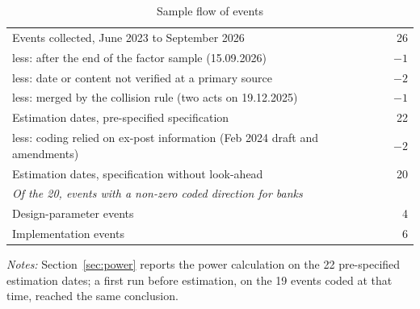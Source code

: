 \documentclass[11pt]{article}
\theoremstyle{plain}\newtheorem{proposition}{Proposition}
\begin{document}
\begin{table}[ht]\centering\small
\begin{threeparttable}
\caption{Sample flow of events}\label{tab:flow}
\begin{tabular}{lr}
\toprule
Events collected, June 2023 to September 2026 & 26 \\
\quad less: after the end of the factor sample (15.09.2026) & $-1$ \\
\quad less: date or content not verified at a primary source & $-2$ \\
\quad less: merged by the collision rule (two acts on 19.12.2025) & $-1$ \\
Estimation dates, pre-specified specification & 22 \\
\quad less: coding relied on ex-post information (Feb 2024 draft and amendments) & $-2$ \\
Estimation dates, specification without look-ahead & 20 \\[3pt]
\multicolumn{2}{l}{\textit{Of the 20, events with a non-zero coded direction for banks}} \\
\quad Design-parameter events & 4 \\
\quad Implementation events & 6 \\
\bottomrule
\end{tabular}
\begin{tablenotes}\footnotesize
\item \textit{Notes:} Section~\ref{sec:power} reports the power calculation on the 22 pre-specified estimation dates; a first run before estimation, on the 19 events coded at that time, reached the same conclusion.
\end{tablenotes}
\end{threeparttable}
\end{table}
\end{document}
